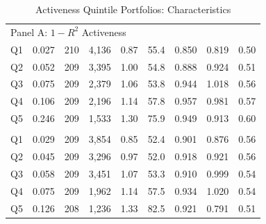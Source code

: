 \begin{table}[!htbp]
{\begin{tabular*}{\linewidth}{@{\extracolsep{\fill}}lrrrrrrrr}
\multicolumn{9}{l}{Panel A: $1-R^2$ Activeness}\\
\hspace{1em}Q1 & 0.027 & 210 & 4,136 & 0.87 & 55.4 & 0.850 & 0.819 & 0.50\\
\hspace{1em}Q2 & 0.052 & 209 & 3,395 & 1.00 & 54.8 & 0.888 & 0.924 & 0.51\\
\hspace{1em}Q3 & 0.075 & 209 & 2,379 & 1.06 & 53.8 & 0.944 & 1.018 & 0.56\\
\hspace{1em}Q4 & 0.106 & 209 & 2,196 & 1.14 & 57.8 & 0.957 & 0.981 & 0.57\\
\hspace{1em}Q5 & 0.246 & 209 & 1,533 & 1.30 & 75.9 & 0.949 & 0.913 & 0.60\\
\addlinespace[0.3em]
\hline
\multicolumn{9}{l}{Panel B: Tracking Error Activeness}\\
\hspace{1em}Q1 & 0.029 & 209 & 3,854 & 0.85 & 52.4 & 0.901 & 0.876 & 0.56\\
\hspace{1em}Q2 & 0.045 & 209 & 3,296 & 0.97 & 52.0 & 0.918 & 0.921 & 0.56\\
\hspace{1em}Q3 & 0.058 & 209 & 3,451 & 1.07 & 53.3 & 0.910 & 0.999 & 0.54\\
\hspace{1em}Q4 & 0.075 & 209 & 1,962 & 1.14 & 57.5 & 0.934 & 1.020 & 0.54\\
\hspace{1em}Q5 & 0.126 & 208 & 1,236 & 1.33 & 82.5 & 0.921 & 0.791 & 0.51\\
\bottomrule
\end{tabular*}%
}\sbefit
\fi
\setlength{\tabletempwidth}{\wd\tabletempbox}
\ifdim\tabletempwidth>\linewidth\setlength{\tabletempwidth}{\linewidth}\fi
\begin{minipage}{\tabletempwidth}
\captionsetup{width=\linewidth}
\caption{Activeness Quintile Portfolios: Characteristics}\label{tab:activeness_chars}
\ifdim\wd\tabletempbox>\linewidth
  \resizebox{\linewidth}{!}{\usebox{\tabletempbox}}
\else
  \usebox{\tabletempbox}
\fi
\par\medskip
\begin{singlespace}\tablefont\noindent

\end{singlespace}
\end{minipage}
\end{table}
